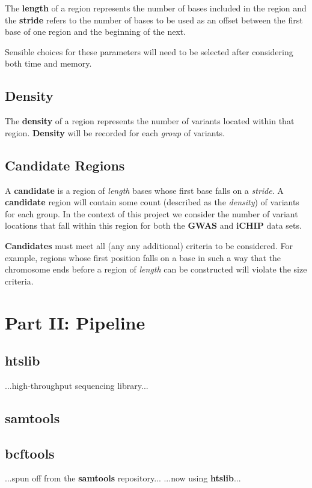 The \textbf{length} of a region represents the number of bases included in the
region and the \textbf{stride} refers to the number of bases to be used as an
offset between the first base of one region and the beginning of the next.

Sensible choices for these parameters will need to be selected after considering
both time and memory.


\subsection{Density}

The \textbf{density} of a region represents the number of variants located
within that region. \textbf{Density} will be recorded for each \textit{group} of
variants.


\subsection{Candidate Regions}

A \textbf{candidate} is a region of \textit{length} bases whose first base falls
on a \textit{stride}. A \textbf{candidate} region will contain some count
(described as the \textit{density}) of variants for each group. In the context
of this project we consider the number of variant locations that fall within
this region for both the \textbf{GWAS} and \textbf{iCHIP} data sets.

\textbf{Candidates} must meet all (any any additional) criteria to be considered.
For example, regions whose first position falls on a base in such a way that the
chromosome ends before a region of \textit{length} can be constructed will
violate the size criteria.

\section{Part II: Pipeline}
\label{app:concepts-p2-2}

\subsection{htslib}
...high-throughput sequencing library...

\subsection{samtools}
\subsection{bcftools}
...spun off from the \textbf{samtools} repository...
...now using \textbf{htslib}...

